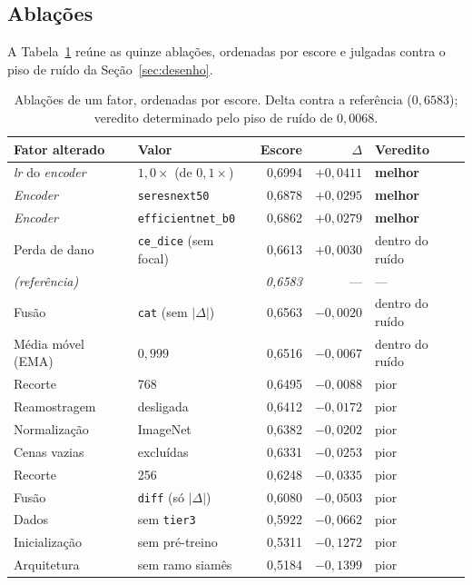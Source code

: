 \documentclass[11pt,a4paper]{article}
\begin{document}
\subsection{Ablações}
\label{sec:ablacoes}

A Tabela~\ref{tab:ablacoes} reúne as quinze ablações, ordenadas por escore e
julgadas contra o piso de ruído da Seção~\ref{sec:desenho}.

\begin{table}[htbp]
\centering
\caption{Ablações de um fator, ordenadas por escore. Delta contra a referência
($0{,}6583$); veredito determinado pelo piso de ruído de $0{,}0068$.}
\label{tab:ablacoes}
\begin{tabular}{llrrl}
\toprule
\textbf{Fator alterado} & \textbf{Valor} & \textbf{Escore} & \textbf{$\Delta$} &
\textbf{Veredito} \\
\midrule
\emph{lr} do \emph{encoder} & $1{,}0\times$ (de $0{,}1\times$) & 0{,}6994 & $+0{,}0411$ & \textbf{melhor} \\
\emph{Encoder}              & \texttt{seresnext50}            & 0{,}6878 & $+0{,}0295$ & \textbf{melhor} \\
\emph{Encoder}              & \texttt{efficientnet\_b0}       & 0{,}6862 & $+0{,}0279$ & \textbf{melhor} \\
Perda de dano               & \texttt{ce\_dice} (sem focal)   & 0{,}6613 & $+0{,}0030$ & dentro do ruído \\
\multicolumn{2}{l}{\emph{(referência)}}                       & \emph{0{,}6583} & --- & --- \\
Fusão                       & \texttt{cat} (sem $|\Delta|$)   & 0{,}6563 & $-0{,}0020$ & dentro do ruído \\
Média móvel (EMA)           & $0{,}999$                       & 0{,}6516 & $-0{,}0067$ & dentro do ruído \\
Recorte                     & 768                             & 0{,}6495 & $-0{,}0088$ & pior \\
Reamostragem                & desligada                       & 0{,}6412 & $-0{,}0172$ & pior \\
Normalização                & ImageNet                        & 0{,}6382 & $-0{,}0202$ & pior \\
Cenas vazias                & excluídas                       & 0{,}6331 & $-0{,}0253$ & pior \\
Recorte                     & 256                             & 0{,}6248 & $-0{,}0335$ & pior \\
Fusão                       & \texttt{diff} (só $|\Delta|$)   & 0{,}6080 & $-0{,}0503$ & pior \\
Dados                       & sem \texttt{tier3}              & 0{,}5922 & $-0{,}0662$ & pior \\
Inicialização               & sem pré-treino                  & 0{,}5311 & $-0{,}1272$ & pior \\
Arquitetura                 & sem ramo siamês                 & 0{,}5184 & $-0{,}1399$ & pior \\
\bottomrule
\end{tabular}
\end{table}
\end{document}
